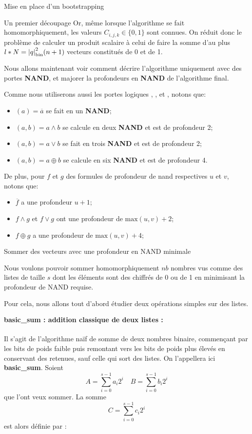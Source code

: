 \begin{section}{Mise en place d'un bootstrapping}
\begin{subsection}{Un premier découpage}
	Or, même lorsque l'algorithme se fait homomorphiquement, les valeurs
	$C_{i,j,k} \in \{ 0,1 \}$ sont connues. On réduit donc le problème de
	calculer un produit scalaire à celui de faire la somme d'au plus $l * N
	= {|q|}_{\text{bin}}^2 (n+1)$ vecteurs constitués de 0 et de 1.

	Nous allons maintenant voir comment décrire l'algorithme uniquement avec des portes \textbf{NAND}, et majorer la profondeurs en \textbf{NAND} de l'algorithme final.

	Comme nous utiliserons aussi les portes logiques , ,  et , notons que:
\begin{itemize}
\item {}$(a) = \overline{a}$ se fait en un \textbf{NAND};
\item {}$(a, b) = a \land b$ se calcule en deux \textbf{NAND} et est de
	profondeur 2;
\item {}$(a, b) = a \lor b$ se fait en trois \textbf{NAND} et est de
	profondeur 2;
\item {}$(a, b) = a \oplus b$ se calcule en six \textbf{NAND} et est de
	profondeur 4.
\end{itemize}
De plus, pour $f$ et $g$ des formules de profondeur de nand respectives $u$ et
$v$, notons que:
\begin{itemize}
\item $\overline{f}$ a une profondeur $u+1$;
\item $f \land g$ et $f \lor g$ ont une profondeur de $\text{max}(u,v) + 2$;
\item $f \oplus g$ a une profondeur de $\text{max}(u,v) + 4$;
\end{itemize}
\end{subsection}
\begin{subsection}{Sommer des vecteurs avec une profondeur en NAND minimale}

	Nous voulons pouvoir sommer homomorphiquement $nb$ nombres vus comme des listes de taille $s$ dont les éléments sont des chiffrés de 0 ou de 1 en minimisant la profondeur de NAND requise. 

	Pour cela, nous allons tout d'abord étudier deux opérations simples sur des listes.


\vspace{0.3cm}
\noindent
\textbf{basic\_sum : addition classique de deux listes :}
\paragraph{}
	Il s'agit de l'algorithme naïf de somme de deux nombres binaire, commençant par les bits de poids faible puis remontant vers les bits de poids plus élevés en conservant des retenues, sauf celle qui \og sort \fg des listes. On l'appellera ici \textbf{basic\_sum}. Soient 
\[ A = \sum_{i=0}^{s-1} a_i 2^i \quad B = \sum_{i=0}^{s-1} b_i 2^i\]
que l'ont veux sommer. La somme
\[C =\sum_{i=0}^{s-1} c_i 2^i\]
est alors définie par :
	

\end{subsection}
\end{section}
